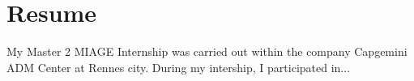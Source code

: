 \chapter*{Resume}

My Master 2 MIAGE Internship was carried out within the company Capgemini ADM Center at Rennes city.
\newline
During my intership, I participated in...
